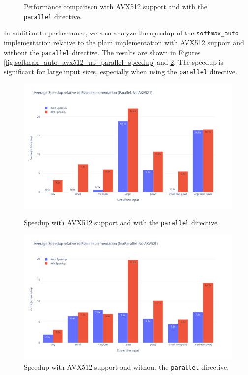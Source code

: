 \documentclass[10pt]{article}
\begin{document}
\begin{figure}[ht!]
\begin{minipage}{0.49\textwidth}
    \caption{Performance comparison with AVX512 support and with the \texttt{parallel} directive.}
    \label{fig:softmax_auto_avx512_parallel}
  \end{minipage}
\end{figure}

In addition to performance, we also analyze the speedup of the \texttt{softmax\_auto} implementation relative to the plain implementation with AVX512 support and without the \texttt{parallel} directive. The results are shown in Figures \ref{fig:softmax_auto_avx512_no_parallel_speedup} and \ref{fig:softmax_auto_avx512_parallel_speedup}. The speedup is significant for large input sizes, especially when using the \texttt{parallel} directive.

\begin{figure}[h!]
  \centering
  \begin{minipage}{0.49\textwidth}
    \centering
    \includegraphics[width=\linewidth]{../images/softmax_parallel_axv521_speedup.pdf}
    \caption{Speedup with AVX512 support and with the \texttt{parallel} directive.}
    \label{fig:softmax_auto_avx512_no_parallel_speedup}
  \end{minipage}%
  \hfill
  \begin{minipage}{0.49\textwidth}
    \centering
    \includegraphics[width=\linewidth]{../images/softmax_noparallel_axv521_speedup.pdf}
    \caption{Speedup with AVX512 support and without the \texttt{parallel} directive.}
    \label{fig:softmax_auto_avx512_parallel_speedup}
  \end{minipage}
\end{figure}
\end{document}
